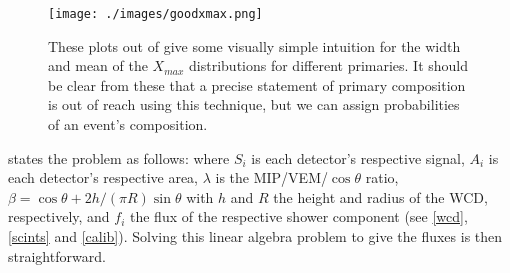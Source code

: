 \begin{center}
\begin{figure}[H]
\texttt{[image: ./images/goodxmax.png]}
\caption[$X_{max}$ Distributions]{These plots out of  give some visually simple intuition for the width and mean of the $X_{max}$ distributions for different primaries. It should be clear from these that a precise statement of primary composition is out of reach using this technique, but we can assign probabilities of an event's composition.}
\label{goodxmax}
\end{figure}
\end{center}

 states the problem as follows:
where $S_i$ is each detector's respective signal, $A_i$ is each detector's respective area, $\lambda$ is the MIP/VEM/$\cos\theta$ ratio, $\beta=\cos\theta+2h/(\pi R)\sin\theta$ with $h$ and $R$ the height and radius of the WCD, respectively, and $f_i$ the flux of the respective shower component (see \autoref{wcd}, \autoref{scints} and \autoref{calib}). Solving this linear algebra problem to give the fluxes is then straightforward.

